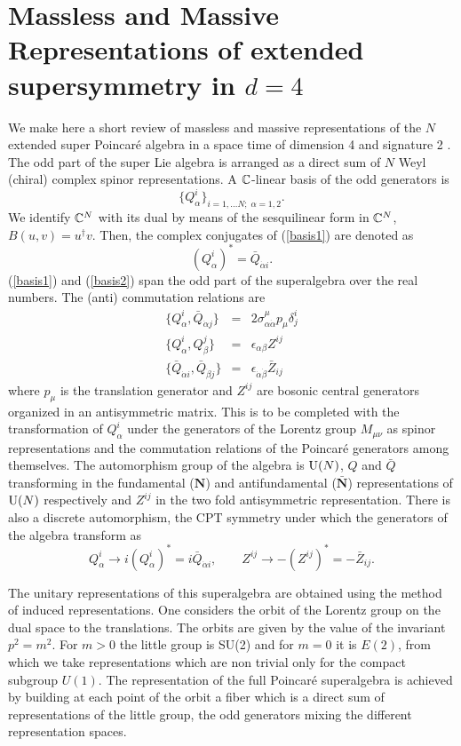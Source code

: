\documentclass[a4paper,12pt]{article}
\begin{document}
\section{Massless and Massive Representations of extended supersymmetry in $d=4$}
We make here a short review of massless and massive representations  of the  $N$ extended super
 Poincar\'e algebra  in a space
time of dimension 4 and signature 2 \cite{fsz,st}. The odd part of the super Lie
algebra is arranged as a  direct sum of  $N$ Weyl (chiral) complex
spinor representations. A $\mathbb{C}$-linear basis of the odd generators
is
\begin{equation}\{Q^i_\alpha\}_{i=1,\dots N;
\; \alpha=1,2}.\label{basis1}\end{equation} We identify $\mathbb{C}^N$
with its dual by means of the sesquilinear form in $\mathbb{C}^N$,
$B(u,v)=u^\dagger v$. Then, the complex conjugates of
(\ref{basis1}) are denoted as
\begin{equation} (Q_\alpha^i)^*=\bar Q_{\dot\alpha
i}.\label{basis2}\end{equation}   (\ref{basis1}) and
(\ref{basis2}) span the odd part of the superalgebra over the real
numbers. The (anti) commutation relations are
 \begin{eqnarray}\{Q_\alpha^i,\bar Q_{\dot\alpha
 j}\}&=&2\sigma_{\alpha\dot\alpha}^\mu
 p_\mu\delta^i_j\nonumber \\\{Q_\alpha^i, Q_{\beta}^j\}&=&\epsilon_{\alpha\beta}Z^{ij}
 \nonumber\\\{\bar Q_{\dot\alpha i},\bar Q_{\dot\beta
 j}\}&=&\epsilon_{\dot\alpha\dot\beta}\bar Z_{ij}
 \label{susy}
 \end{eqnarray}
 where $p_\mu$ is the translation generator and $Z^{ij}$ are bosonic central generators
  organized in an
antisymmetric matrix.
 This is to be completed with the transformation of $Q_\alpha^i$ under the generators of
 the Lorentz group $M_{\mu\nu}$ as spinor representations and the
 commutation relations of the Poincar\'e generators among themselves.
  The automorphism group of the algebra is
$\mathrm{U}(N)$, $Q$ and $\bar Q$ transforming in the fundamental
($\mathbf{N}$) and antifundamental ($\bar{\mathbf{N}}$)
representations of $\mathrm{U}(N)$ respectively and $Z^{ij}$ in the two
fold antisymmetric representation. There is also a discrete
automorphism, the  CPT symmetry under which
 the generators of the algebra transform as
$$Q_\alpha^i\rightarrow i(Q_\alpha^i)^*=i\bar Q_{\dot\alpha i},\qquad Z^{ij}\rightarrow -(Z^{ij})^*=-\bar Z_{ij}.$$


The unitary representations of this superalgebra are obtained using the method of
 induced representations. One considers the orbit of the Lorentz group on the dual space to the translations.
  The orbits are given by the value of the invariant $p^2=m^2$. For $m>0$ the little group is SU(2) and for $m=0$
  it is  $E(2)$, from which we take representations which are non trivial only for the compact subgroup $U(1)$.
  The representation of the full Poincar\'e superalgebra is achieved by building at each point of the orbit a
   fiber which is a direct sum of representations of the little group, the odd generators mixing the different
   representation spaces.
\end{document}
